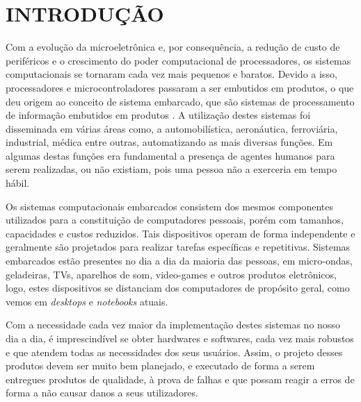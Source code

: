
\chapter{INTRODUÇÃO}
\label{chap:introducao}
Com a evolução da microeletrônica e, por consequência, a redução de custo de periféricos e o crescimento do poder computacional de processadores, os sistemas computacionais se tornaram cada vez mais pequenos e baratos. Devido a isso, processadores e microcontroladores passaram a ser embutidos em produtos, o que deu origem ao conceito de sistema embarcado, que são sistemas de processamento de informação embutidos em produtos \cite{Marwedel2006}.
A utilização destes sistemas foi disseminada em várias áreas como, a automobilística, aeronáutica, ferroviária, industrial, médica entre outras, automatizando as mais diversas funções. Em algumas destas funções era fundamental a presença de agentes humanos para serem realizadas, ou não existiam, pois uma pessoa não a exerceria em tempo hábil.



Os sistemas computacionais embarcados consistem dos mesmos componentes utilizados para a constituição de computadores pessoais, porém com tamanhos, capacidades e custos reduzidos. Tais dispositivos operam de forma independente e geralmente são projetados para realizar tarefas específicas e repetitivas. 
Sistemas embarcados estão presentes no dia a dia da maioria das pessoas, em micro-ondas, geladeiras, TVs, aparelhos de som, video-games e outros produtos eletrônicos\cite{Marwedel2006}, logo, estes dispositivos se distanciam dos computadores de propósito geral, como vemos em \textit{desktops} e \textit{notebooks} atuais. 




Com a necessidade cada vez maior da implementação destes sistemas no nosso dia a dia, é imprescindível se obter hardwares e softwares, cada vez mais robustos e que atendem todas as necessidades dos seus usuários.
Assim, o projeto desses produtos devem ser muito bem planejado, e executado de forma a serem entregues produtos de qualidade, à  prova de falhas e que possam reagir a erros de forma a não causar danos a seus utilizadores. 

